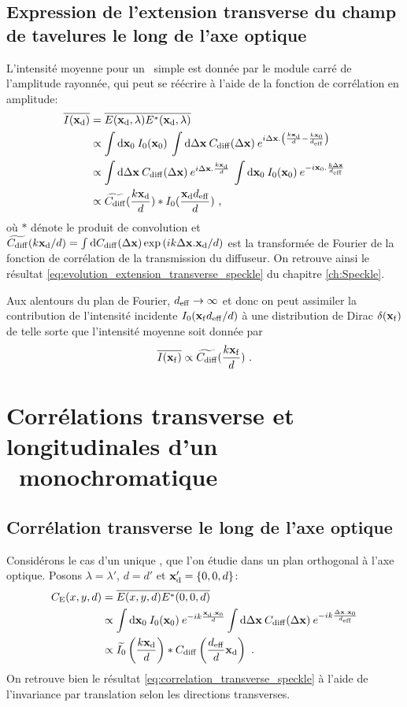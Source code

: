 \subsection{Expression de l'extension transverse du champ de tavelures le long de l'axe optique}
L'intensité moyenne pour un \speckle\ simple est donnée par le module carré de l'amplitude rayonnée, qui peut se réécrire à l'aide de la fonction de corrélation en amplitude:
\begin{align}
\overline{I(\mathbf{x}_{\mathrm{d}})} &= \overline{E(\mathbf{x}_{\mathrm{d}},\lambda)E^*(\mathbf{x}_{\mathrm{d}},\lambda)} \\
&\propto \int{\mathop{}\mathopen{}\mathrm{d}\mathbf{x}_0\: I_0(\mathbf{x}_0) \: \int{\mathop{}\mathopen{}\mathrm{d}\Delta\mathbf{x}\: C_{\mathrm{diff}}(\Delta\mathbf{x}) \: e^{i\Delta\mathbf{x}. \left( \frac{k\mathbf{x}_{\mathrm{d}}}{d}-\frac{k\mathbf{x}_0}{d_{\mathrm{eff}}}\right)}}} \\
&\propto \int{\mathop{}\mathopen{}\mathrm{d}\Delta\mathbf{x}\: C_{\mathrm{diff}}(\Delta\mathbf{x}) \: e^{i \Delta\mathbf{x}. \frac{k\mathbf{x}_{\mathrm{d}}}{d}} \: \int{\mathop{}\mathopen{}\mathrm{d}\mathbf{x}_0\: I_0(\mathbf{x}_0) \: e^{-i \mathbf{x}_0.\frac{k\Delta\mathbf{x}}{d_{\mathrm{eff}}}}}} \\
&\propto \widetilde{C_{\mathrm{diff}}}(\frac{k\mathbf{x}_{\mathrm{d}}}{d}) \ast I_0(\frac{\mathbf{x}_{\mathrm{d}}d_{\mathrm{eff}}}{d}) \text{ ,}
\end{align}
où $\ast$ dénote le produit de convolution et $\widetilde{C_{\mathrm{diff}}}(k\mathbf{x}_{\mathrm{d}}/d)=\int{\mathop{}\mathopen{}\mathrm{d}C_{\mathrm{diff}}(\Delta\mathbf{x})\exp{(ik\Delta\mathbf{x}.\mathbf{x}_{\mathrm{d}}/d)}}$ est la transformée de Fourier de la fonction de corrélation de la transmission du diffuseur. On retrouve ainsi le résultat \ref{eq:evolution_extension_transverse_speckle} du chapitre \ref{ch:Speckle}.

Aux alentours du plan de Fourier, $d_{\mathrm{eff}}\rightarrow\infty$ et donc on peut assimiler la contribution de l'intensité incidente $I_0(\mathbf{x}_{\mathrm{f}}d_{\mathrm{eff}}/d)$ à une distribution de Dirac $\delta(\mathbf{x}_{\mathrm{f}})$ de telle sorte que l'intensité moyenne soit donnée par
\begin{equation}
\overline{I(\mathbf{x}_{\mathrm{f}})} \propto \widetilde{C_{\mathrm{diff}}} (\frac{k\mathbf{x}_{\mathrm{f}}}{d}) \text{ .}
\end{equation}





\section{Corrélations transverse et longitudinales d'un \speckle\ monochromatique}%
\subsection{Corrélation transverse le long de l'axe optique}
Considérons le cas d'un unique \speckle , que l'on étudie dans un plan orthogonal à l'axe optique. Posons $\lambda = \lambda'$, $d=d'$ et $\mathbf{x}_{\mathrm{d}}'=\lbrace 0,0,d \rbrace$:
\begin{align}
C_{\mathrm{E}}(x,y,d)&=\overline{E(x,y,d)E^*(0,0,d)}\\
&\propto \int{\mathop{}\mathopen{}\mathrm{d}\mathbf{x}_0\: I_0(\mathbf{x}_0) \: e^{-ik\frac{\mathbf{x}_{\mathrm{d}}.\mathbf{x}_0}{d}} \int{\mathop{}\mathopen{}\mathrm{d}\Delta\mathbf{x}\: C_{\mathrm{diff}}(\Delta\mathbf{x})\: e^{-ik\frac{\Delta\mathbf{x}.\mathbf{x}_0}{d_{\mathrm{eff}}}}}}\\
&\propto \widetilde{I_0}\left(\frac{k\mathbf{x}_{\mathrm{d}}}{d}\right) \ast C_{\mathrm{diff}} \left( \frac{d_{\mathrm{eff}}}{d} \mathbf{x}_{\mathrm{d}}\right) \text{ .}
\end{align}
On retrouve bien le résultat \ref{eq:correlation_transverse_speckle} à l'aide de l'invariance par translation selon les directions transverses. 

